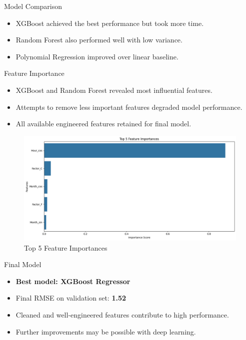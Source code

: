 \documentclass{beamer}
\begin{document}
\begin{frame}{Model Comparison}
  \begin{itemize}
    \item XGBoost achieved the best performance but took more time.
    \item Random Forest also performed well with low variance.
    \item Polynomial Regression improved over linear baseline.
  \end{itemize}
\end{frame}

\begin{frame}{Feature Importance}
\begin{itemize}
    \item XGBoost and Random Forest revealed most influential features.
    \item Attempts to remove less important features degraded model performance.
    \item All available engineered features retained for final model.
\end{itemize}
  \begin{figure}
\vfill
    \centering
    \includegraphics[width=0.6\linewidth]{images/fi_xgb.png}
    \caption{Top 5 Feature Importances}
    \label{fig:enter-label}
\end{figure}
\end{frame}

\begin{frame}{Final Model}
\begin{itemize}
    \item \textbf{Best model: XGBoost Regressor}
    \item Final RMSE on validation set: \textbf{1.52}
    \item Cleaned and well-engineered features contribute to high performance.
    \item Further improvements may be possible with deep learning.
\end{itemize}
\end{frame}
\end{document}
